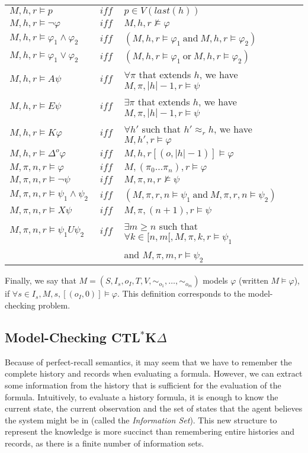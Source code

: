 \documentclass{acmart}
\def\ctlskd{CTL$^{*}$K$\Delta$}
\def\A{\mathit{A}}
\def\E{\mathit{E}}
\def\U{\mathit{U}}
\def\X{\mathit{X}}
\def\K{\mathit{K}}
\def\D#1{\Delta^{#1}}
\def\eqh#1{\approx_{#1}}
\def\eqstate#1{\sim_{#1}}
\def\iff{\ \mathit{iff}\ }
\begin{document}
\begin{tabular}{l c l}
  $M,h,r \models p $&$ \iff $&$ p\in V(\mathit{last}(h))$\\
  $M,h,r \models \neg\varphi $&$ \iff $&$ M,h,r\not\models\varphi$\\
  $M,h,r \models \varphi_1\wedge\varphi_2 $&$ \iff $&$ (M,h,r\models\varphi_1~\text{and}~ M,h,r\models\varphi_2)$\\
  $M,h,r \models \varphi_1\vee\varphi_2 $&$ \iff $&$ (M,h,r\models\varphi_1~\text{or}~ M,h,r\models\varphi_2)$\\
  $M,h,r \models \A\psi  $&$ \iff $&$ \forall\pi$ that extends $h$, we have $M,\pi,|h|-1,r\models\psi$\\
  $M,h,r \models \E\psi  $&$ \iff $&$ \exists\pi$ that extends $h$, we have $M,\pi,|h|-1,r\models\psi$\\
  $M,h,r \models\K\varphi  $&$ \iff $&$ \forall h'$ such that $h'\eqh{r}h$, we have $M,h',r\models\varphi$\\
  $M,h,r \models \D{o}\varphi $&$ \iff $&$ M,h,r[(o,|h|-1)]\models\varphi$\\
  $M,\pi,n,r\models\varphi $&$ \iff $&$ M,(\pi_0\dots\pi_n),r\models\varphi$\\
  $M,\pi,n,r\models\neg\psi $&$ \iff $&$ M,\pi,n,r\not\models\psi$\\
  $M,\pi,n,r\models \psi_1\wedge\psi_2 $&$ \iff $&$ (M,\pi,r,n\models\psi_1~\text{and}~ M,\pi,r,n\models\psi_2)$\\
  $M,\pi,n,r\models\X\psi $&$ \iff $&$  M,\pi,(n+1),r\models\psi$\\
  $M,\pi,n,r\models \psi_1\U\psi_2 $&$ \iff $&$ \exists m\geq n$ such that $\forall k\in[n,m[, M,\pi,k,r\models\psi_1$\\
   & & and $M,\pi,m,r\models\psi_2$
\end{tabular}

Finally, we say that $M=(S,I_s,o_I,T,V,\eqstate{o_1},\dots,\eqstate{o_m})$ models $\varphi$ (written $M\models\varphi$), if $\forall s\in I_s, M,s,[(o_I,0)]\models\varphi$. This definition corresponds to the model-checking problem.

\subsection{Model-Checking \ctlskd}
Because of perfect-recall semantics, it may seem that we have to remember the complete history and records when evaluating a formula. However, we can extract some information from the history that is sufficient for the evaluation of the formula. Intuitively, to evaluate a history formula, it is enough to know the current state, the current observation and the set of states that the agent believes the system might be in (called the \textit{Information Set}). This new structure to represent the knowledge is more succinct than remembering entire histories and records, as there is a finite number of information sets.
\end{document}
